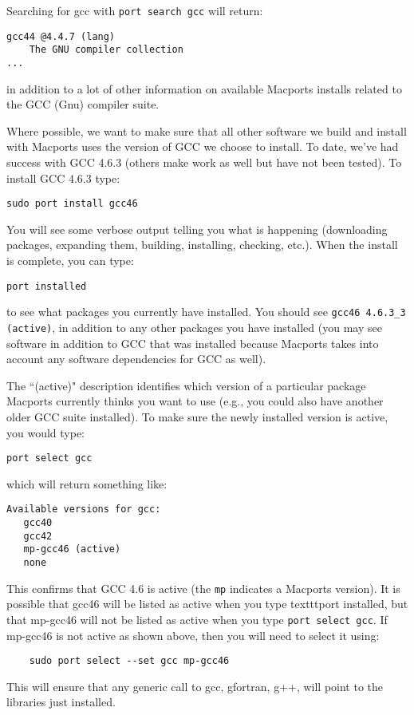 \begin{mdframed}[style=mac] %
Searching for gcc with \texttt{port search gcc} will return:

\begin{verbatim}
gcc44 @4.4.7 (lang) 
    The GNU compiler collection 
...
\end{verbatim}

in addition to a lot of other information on available Macports installs related to the GCC (Gnu) compiler suite. 

Where possible, we want to make sure that all other software we build and install 
with Macports uses the version of GCC we choose to install. To date, we've had success 
with GCC 4.6.3 (others make work as well but have not been tested). 
To install GCC 4.6.3 type:

\texttt{sudo port install gcc46}

You will see some verbose output telling you what is happening (downloading packages, 
expanding them, building, installing, checking, etc.). When the install is complete, you can type: 

\texttt{port installed} 

to see what packages you currently have installed. You should see \texttt{gcc46 \@4.6.3\_3 (active)}, 
in addition to any other packages you have installed (you may see software in addition to GCC 
that was installed because Macports takes into account any software dependencies for GCC as well). 

The ``(active)" description identifies which version of a particular package Macports 
currently thinks you want to use (e.g., you could also have another older GCC suite installed). 
To make sure the newly installed version is active, you would type:

\texttt{port select gcc}

which will return something like:

\begin{verbatim}
Available versions for gcc:
   gcc40
   gcc42
   mp-gcc46 (active)
   none
\end{verbatim}

This confirms that GCC 4.6 is active (the \texttt{mp} indicates a Macports version). 
It is possible that gcc46 will be listed as active when you type texttt{port installed}, 
but that mp-gcc46 will not be listed as active when you type \texttt{port select gcc}. 
If mp-gcc46 is not active as shown above, then you will need to select it using:

\begin{verbatim}
	sudo port select --set gcc mp-gcc46
\end{verbatim}

This will ensure that any generic call to gcc, gfortran, g++, will point to the libraries just installed.

\end{mdframed}              %


